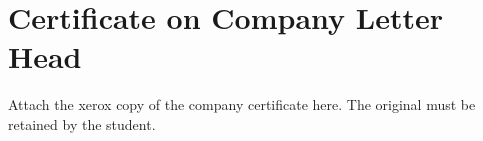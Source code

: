 \chapter*{Certificate on Company Letter Head}

Attach the xerox copy of the company certificate here. The original must be retained by the student.
